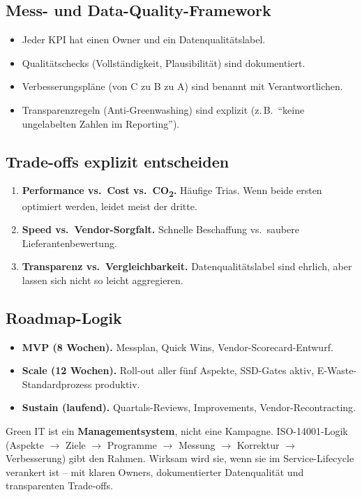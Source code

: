 \documentclass[11pt,a4paper,oneside]{article}
\begin{document}
\subsection{Mess- und Data-Quality-Framework}

\begin{itemize}
  \item Jeder KPI hat einen Owner und ein Datenqualitätslabel.
  \item Qualitätschecks (Vollständigkeit, Plausibilität) sind dokumentiert.
  \item Verbesserungspläne (von C zu B zu A) sind benannt mit Verantwortlichen.
  \item Transparenzregeln (Anti-Greenwashing) sind explizit (z.\,B.\ ``keine ungelabelten Zahlen im Reporting'').
\end{itemize}

\subsection{Trade-offs explizit entscheiden}

\begin{enumerate}
  \item \textbf{Performance vs.\ Cost vs.\ CO\textsubscript{2}.} Häufige Trias. Wenn beide ersten optimiert werden, leidet meist der dritte.
  \item \textbf{Speed vs.\ Vendor-Sorgfalt.} Schnelle Beschaffung vs.\ saubere Lieferantenbewertung.
  \item \textbf{Transparenz vs.\ Vergleichbarkeit.} Datenqualitätslabel sind ehrlich, aber lassen sich nicht so leicht aggregieren.
\end{enumerate}

\subsection{Roadmap-Logik}

\begin{itemize}
  \item \textbf{MVP (8 Wochen).} Messplan, Quick Wins, Vendor-Scorecard-Entwurf.
  \item \textbf{Scale (12 Wochen).} Roll-out aller fünf Aspekte, SSD-Gates aktiv, E-Waste-Standardprozess produktiv.
  \item \textbf{Sustain (laufend).} Quartals-Reviews, Improvements, Vendor-Recontracting.
\end{itemize}

\begin{merkbox}
Green IT ist ein \textbf{Managementsystem}, nicht eine Kampagne. ISO-14001-Logik (Aspekte $\to$ Ziele $\to$ Programme $\to$ Messung $\to$ Korrektur $\to$ Verbesserung) gibt den Rahmen. Wirksam wird sie, wenn sie im Service-Lifecycle verankert ist -- mit klaren Owners, dokumentierter Datenqualität und transparenten Trade-offs.
\end{merkbox}
\end{document}
